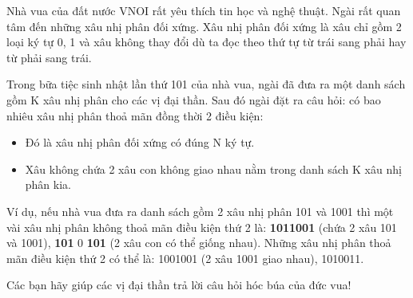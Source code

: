 Nhà vua của đất nước VNOI rất yêu thích tin học và nghệ thuật. Ngài rất quan tâm đến những xâu nhị phân đối xứng. Xâu nhị phân đối xứng là xâu chỉ gồm 2 loại ký tự 0, 1 và xâu không thay đổi dù ta đọc theo thứ tự từ trái sang phải hay từ phải sang trái.

Trong bữa tiệc sinh nhật lần thứ 101 của nhà vua, ngài đã đưa ra một danh sách gồm K xâu nhị phân cho các vị đại thần. Sau đó ngài đặt ra câu hỏi: có bao nhiêu xâu nhị phân thoả mãn đồng thời 2 điều kiện:
\begin{itemize}
	\item Đó là xâu nhị phân đối xứng có đúng N ký tự.
	\item Xâu không chứa 2 xâu con không giao nhau nằm trong danh sách K xâu nhị phân kia.
\end{itemize}

Ví dụ, nếu nhà vua đưa ra danh sách gồm 2 xâu nhị phân 101 và 1001 thì một vài xâu nhị phân không thoả mãn điều kiện thứ 2 là: \textbf{ 1011001 } (chứa 2 xâu 101 và 1001), \textbf{ 101 } 0 \textbf{ 101 } (2 xâu con có thể giống nhau). Những xâu nhị phân thoả mãn điều kiện thứ 2 có thể là: 1001001 (2 xâu 1001 giao nhau), 1010011.

Các bạn hãy giúp các vị đại thần trả lời câu hỏi hóc búa của đức vua!
